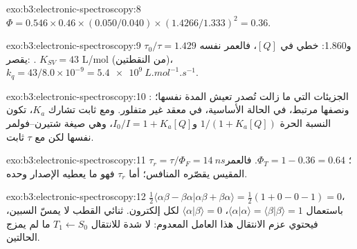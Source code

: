\begin{solution}{exo:b3:electronic-spectroscopy:8}
$\Phi = 0.546 \times 0.46 \times (0.050/0.040) \times (1.4266/1.333)^2 = 0.36$.
\end{solution}

\begin{solution}{exo:b3:electronic-spectroscopy:9}
$\tau_0/\tau = 1.429$ و1.860: خطي في $[Q]$، فالعمر نفسه
يقصر: . $K_{SV} = 43$ L/mol (من النقطتين)، $k_q = 43/8.0
\times 10^{-9} = \qty{5.4e9}{L.mol^{-1}.s^{-1}}$.
\end{solution}

\begin{solution}{exo:b3:electronic-spectroscopy:10}
: الجزيئات التي ما زالت تُصدر تعيش المدة نفسها؛ ونصفها
مرتبط، في الحالة الأساسية، في معقد غير متفلور. ومع
ثابت تشارك $K_a$، تكون النسبة الحرة $1/(1 + K_a[Q])$ و$I_0/I = 1 +
K_a[Q]$، وهي صيغة شتيرن--فولمر نفسها لكن مع $\tau$ ثابت.
\end{solution}

\begin{solution}{exo:b3:electronic-spectroscopy:11}
$\tau_r = \tau/\Phi_F = \qty{14}{ns}$؛ $\Phi_T = 1 - 0.36 = 0.64$. فالعمر المقيس
يقصّره  المنافس؛ أما $\tau_r$ فهو ما يعطيه الإصدار
وحده.
\end{solution}

\begin{solution}{exo:b3:electronic-spectroscopy:12}
$\frac12\langle\alpha\beta - \beta\alpha|\alpha\beta + \beta\alpha\rangle = \frac12(1 + 0 - 0 - 1) = 0$، باستعمال
$\langle\alpha|\alpha\rangle = \langle\beta|\beta\rangle = 1$، $\langle\alpha|\beta\rangle = 0$ لكل إلكترون.
 ثنائي القطب لا يمسّ السبين، فيحتوي عزم الانتقال هذا
العامل المعدوم: لا شدة للانتقال $T_1 \leftarrow S_0$ ما لم يمزج 
الحالتين.
\end{solution}

